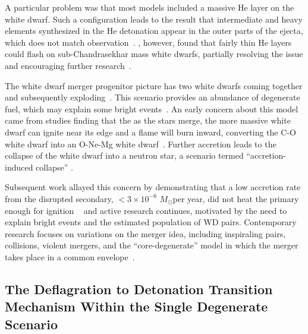 \documentclass[iop,apj]{emulateapj}
\newcommand{\Msun}{\ensuremath{M_\odot}}
\begin{document}
A particular problem was that most models included a massive He layer on
the white dwarf. Such a configuration leads to the result that
intermediate and heavy elements synthesized in the He detonation appear in
the outer parts of the ejecta, which does not match observation~\citep{HoefKhok96,
hoeflichetal96,finkhillebrandtroepke2007,simetal2010}.  \citet{bildstenetal2007},
however, found that fairly thin He layers could flash on sub-Chandrasekhar
mass white dwarfs, partially resolving the issue and encouraging
further research~\citep{simetal2012,brooksetal2015, shenetal2018,
glasneretal2018}.

The white dwarf merger progenitor picture has two white dwarfs coming
together and subsequently exploding~\citep{tutukovyungelson76,tutukovyungelson79,
webbink84,ibentutukov84}. This scenario provides an abundance of degenerate fuel,
which may explain some bright events~\citep{scalzo:2010,Yuan:2010}.
An early concern about this model came from studies finding that
the as the stars merge, the more massive white dwarf can ignite near
its edge and a flame will burn inward, converting the C-O white dwarf into
an O-Ne-Mg white dwarf~\citep{saionomoto1985,saionomoto2004}.  Further accretion
leads to the collapse of the white dwarf
into a neutron star, a scenario termed ``accretion-induced collapse''
\citep{nomotokondo1991}.

Subsequent work allayed this concern {\color{blue} by demonstrating
that a low accretion rate from the disrupted secondary, $ < 3 \times 
10^{-6}$ \Msun per year, did not heat the primary enough for ignition}
~\citep{kawai1987,saionomoto2004,yoonetal2007,lorenaguilaretal2009, 
Shenetal12, pakmoretal2012b}
and active research continues, motivated by the need to explain bright events
and the estimated population of WD pairs. Contemporary
research focuses on variations on the merger idea, including inspiraling pairs,
collisions, violent mergers, and the ``core-degenerate'' model in which the merger
takes place in a common envelope~\citep{raskinetal2009,pakmoretal2011,kashi:2011,
pakmoretal2012a,Shenetal12,katzetal2016}.


\subsection{The Deflagration to Detonation Transition Mechanism Within
the Single Degenerate Scenario}
\end{document}
